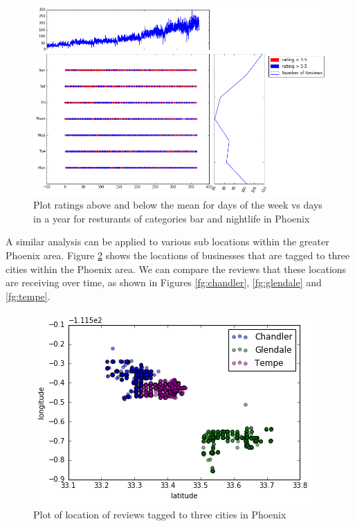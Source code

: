 \documentclass[11pt]{article}
\begin{document}

\begin{figure}[H]
\centering
\includegraphics[keepaspectratio=true,scale=0.4]{./images/bars_nightlife_popularity}
\caption{Plot ratings above and below the mean for days of the week vs days in a year for resturants of categories bar and nightlife in Phoenix}\label{fg:bars_nightlife}
\end{figure}

A similar analysis can be applied to various sub locations within the greater Phoenix area. Figure \ref{fg:locations} shows the locations of businesses that are tagged to three cities within the Phoenix area. We can compare the reviews that these locations are receiving over time, as shown in Figures \ref{fg:chandler}, \ref{fg:glendale} and \ref{fg:tempe}.
\begin{figure}[H]
\centering
\includegraphics[keepaspectratio=true,scale=0.4]{./images/sub_location_plot}
\caption{Plot of location of reviews tagged to three cities in Phoenix}\label{fg:locations}
\end{figure}
\end{document}
